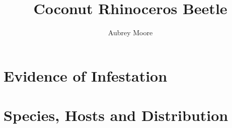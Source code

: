 \documentclass[twocolumn,letterpaper]{article}
\title{Coconut Rhinoceros Beetle}
\author{Aubrey Moore}
\begin{document}
\maketitle

\Blindtext

\section*{Evidence of Infestation}

\cite{jackson_coconut_2020}

\Blindtext

\section*{Species, Hosts and Distribution}

\Blindtext

\printbibliography
\end{document}
